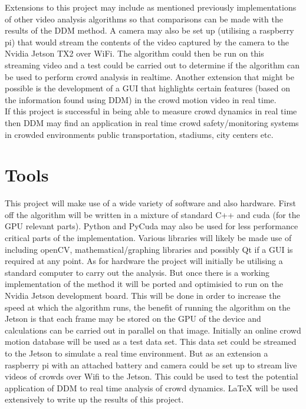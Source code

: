 \documentclass[11pt]{article}
\begin{document}
Extensions to this project may include as mentioned previously implementations of other video analysis algorithms so that comparisons can be made with the results of the DDM method.
A camera may also be set up (utilising a raspberry pi) that would stream the contents of the video captured by the camera to the Nvidia Jetson TX2 over WiFi.
The algorithm could then be run on this streaming video and a test could be carried out to determine if the algorithm can be used to perform crowd analysis in realtime.
Another extension that might be possible is the development of a GUI that highlights certain features (based on the information found using DDM) in the crowd motion video in real time.
\\
If this project is successful in being able to measure crowd dynamics in real time then DDM may find an application in real time crowd safety/monitoring systems in crowded environments public transportation, stadiums, city centers etc.


\section{Tools}
This project will make use of a wide variety of software and also hardware.
First off the algorithm will be written in a mixture of standard C++ and cuda (for the GPU relevant parts).
Python and PyCuda may also be used for less performance critical parts of the implementation.
Various libraries will likely be made use of including openCV, mathematical/graphing libraries and possibly Qt if a GUI is required at any point.
As for hardware the project will initially be utilising a standard computer to carry out the analysis.
But once there is a working implementation of the method it will be ported and optimisied to run on the Nvidia Jetson development board.
This will be done in order to increase the speed at which the algorithm runs, the benefit of running the algorithm on the Jetson
is that each frame may be stored on the GPU of the device and calculations can be carried out in parallel on that image.
Initially an online crowd motion database will be used as a test data set.\cite{crowdMotionDB}
This data set could be streamed to the Jetson to simulate a real time environment.
But as an extension a raspberry pi with an attached battery and camera could be set up to stream live videos of crowds over Wifi to the Jetson.
This could be used to test the potential application of DDM to real time analysis of crowd dynamics.
LaTeX will be used extensively to write up the results of this project.
\end{document}
